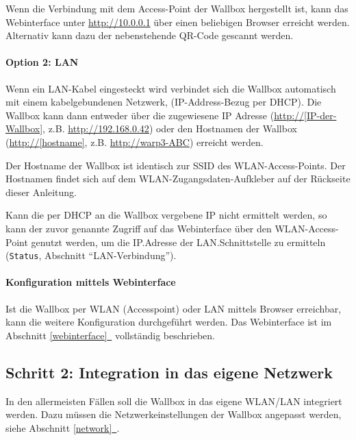 \documentclass[a4paper,10pt]{article}
\newcommand*{\fullref}[1]{Abschnitt \hyperref[{#1}]{\ref*{#1}~\nameref*{#1}}}
\begin{document}
\begin{multicols*}{2}
    \begin{minipage}{0.35\textwidth}
        Wenn die Verbindung mit dem Access-Point der Wallbox hergestellt ist, kann das Webinterface
        unter \url{http://10.0.0.1} über einen beliebigen Browser erreicht werden.
        Alternativ kann dazu der nebenstehende QR-Code gescannt werden.
    \end{minipage}\hfill
    \begin{minipage}{0.12\textwidth}
        \begin{flushright}
        \end{flushright}
    \end{minipage}

    \paragraph{Option 2: LAN}
    Wenn ein LAN-Kabel eingesteckt wird verbindet sich die
    Wallbox automatisch mit einem
    kabelgebundenen Netzwerk, (IP-Address-Bezug
    per DHCP). Die Wallbox kann dann entweder über die zugewiesene IP
    Adresse (\url{http://[IP-der-Wallbox]}, z.B. \url{http://192.168.0.42})
    oder den Hostnamen der Wallbox (\url{http://[hostname]}, z.B.
    \url{http://warp3-ABC}) erreicht werden.

    Der Hostname der Wallbox ist identisch zur SSID des WLAN-Access-Points. Der Hostnamen findet sich
    auf dem WLAN-Zugangsdaten-Aufkleber auf der Rückseite dieser Anleitung.

    Kann die per DHCP an die Wallbox vergebene IP nicht ermittelt werden, so kann der
    zuvor genannte Zugriff auf das Webinterface über den WLAN-Access-Point genutzt
    werden, um die IP.Adresse der LAN.Schnittstelle zu ermitteln (\texttt{Status},
    Abschnitt \enquote{LAN-Verbindung}).

    \paragraph{Konfiguration mittels Webinterface}
    Ist die Wallbox per WLAN (Accesspoint) oder LAN mittels Browser erreichbar,
    kann die weitere Konfiguration durchgeführt werden.
    Das Webinterface ist im \fullref{webinterface} vollständig beschrieben.

    \subsection{Schritt 2: Integration in das eigene Netzwerk}
    In den allermeisten Fällen soll die Wallbox in das eigene WLAN/LAN
    integriert werden. Dazu müssen die Netzwerkeinstellungen der Wallbox
    angepasst werden, siehe \fullref{network}.


\end{multicols*}
\end{document}
